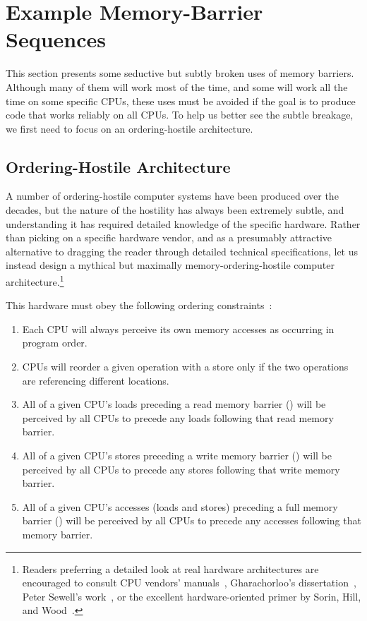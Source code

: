 \section{Example Memory-Barrier Sequences}
\label{sec:app:whymb:Example Memory-Barrier Sequences}

This section presents some seductive but subtly broken uses of
memory barriers.
Although many of them will work most of the time, and some will
work all the time on some specific CPUs, these uses must be avoided
if the goal is to produce code that works reliably on all CPUs.
To help us better see the subtle breakage, we first need to focus
on an ordering-hostile architecture.

\subsection{Ordering-Hostile Architecture}
\label{sec:app:whymb:Ordering-Hostile Architecture}

A number of ordering-hostile computer systems have been produced over
the decades,
but the nature of the hostility has always been extremely subtle,
and understanding it has required detailed knowledge of the specific
hardware.
Rather than picking on a specific hardware vendor, and as a presumably
attractive alternative to dragging the reader through detailed
technical specifications, let us instead design a mythical but maximally
memory-ordering-hostile computer architecture.\footnote{
	Readers preferring a detailed look at real hardware
	architectures are encouraged to consult CPU vendors'
	manuals~\cite{ALPHA95,AMDOpteron02,IntelItanium02v2,PowerPC94,MichaelLyons02a,SPARC94,IntelXeonV3-96a,IntelXeonV2b-96a,IBMzSeries04a},
	Gharachorloo's dissertation~\cite{Gharachorloo95},
	Peter Sewell's work~\cite{PeterSewell2010weakmemory}, or
	the excellent hardware-oriented primer by
	Sorin, Hill, and Wood~\cite{DanielJSorin2011MemModel}.}

This hardware must obey the following ordering
constraints~\cite{PaulMcKenney2005i,PaulMcKenney2005j}:
\begin{enumerate}
\item	Each CPU will always perceive its own memory accesses
	as occurring in program order.
\item	CPUs will reorder a given operation with a store only
	if the two operations are referencing different locations.
\item	All of a given CPU's loads preceding a read memory barrier
	() will be perceived by all CPUs to precede
	any loads following that read memory barrier.
\item	All of a given CPU's stores preceding a write memory barrier
	() will be perceived by all CPUs to precede
	any stores following that write memory barrier.
\item	All of a given CPU's accesses (loads and stores) preceding a
	full memory barrier
	() will be perceived by all CPUs to precede
	any accesses following that memory barrier.
\end{enumerate}

